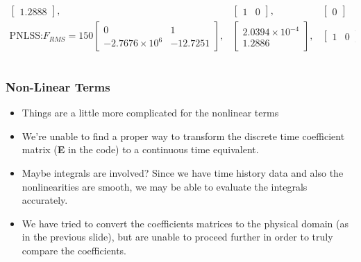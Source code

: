 \documentclass[aspectratio=169]{beamer}
\begin{document}
\begin{frame}[allowframebreaks]
\begin{itemize}
\begin{columns}
\begin{column}{0.5\linewidth}
\begin{alignat*}{4}
\begin{bmatrix}
            1.2888 \end{bmatrix}, &\begin{bmatrix} 1 &
            0 \end{bmatrix}, &\begin{bmatrix} 0 \end{bmatrix}\\
          \text{PNLSS:} F_{RMS}=150 \begin{bmatrix}
            0 & 1\\ -2.7676\times 10^6 & -12.7251
          \end{bmatrix}, &\begin{bmatrix} 2.0394\times 10^{-4}\\
            1.2886 \end{bmatrix}, &\begin{bmatrix} 1 &
            0 \end{bmatrix}, &\begin{bmatrix} 0 \end{bmatrix}
        \end{alignat*}
      \end{column}
    \end{columns}
  \end{itemize}
\end{frame}

\begin{frame}
  \frametitle{Non-Linear Terms}
  \begin{itemize}
  \item Things are a little more complicated for the nonlinear terms
  \item We're unable to find a proper way to transform the discrete
    time coefficient matrix (\textbf{E} in the code) to a continuous
    time equivalent. 
  \item Maybe integrals are involved? Since we have time history data
    and also the nonlinearities are smooth, we may be able to
    evaluate the integrals accurately.
  \item We have tried to convert the coefficients matrices to the
    physical domain (as in the previous slide), but are unable to
    proceed further in order to truly compare the coefficients.
  \end{itemize}
\end{frame}
\end{document}
